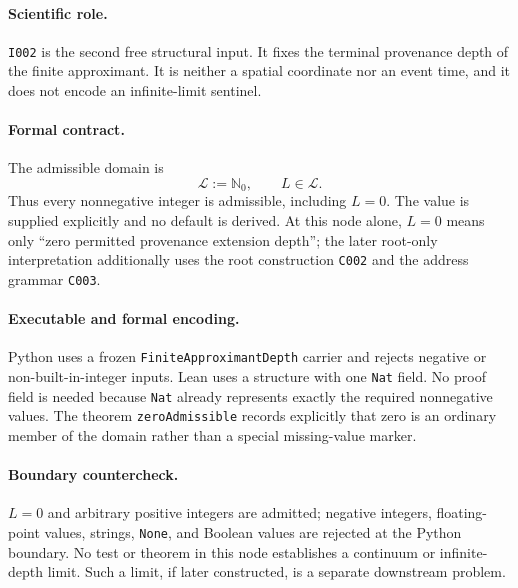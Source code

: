 
\paragraph*{Scientific role.}
\texttt{I002} is the second free structural input.  It fixes the terminal
provenance depth of the finite approximant.  It is neither a spatial
coordinate nor an event time, and it does not encode an infinite-limit
sentinel.

\paragraph*{Formal contract.}
The admissible domain is
\begin{equation}
  \mathcal L := \mathbb N_0,
  \qquad L\in\mathcal L.
  \label{eq:i002-depth-domain}
\end{equation}
Thus every nonnegative integer is admissible, including $L=0$.  The value is
supplied explicitly and no default is derived.  At this node alone, $L=0$
means only ``zero permitted provenance extension depth''; the later
root-only interpretation additionally uses the root construction
\texttt{C002} and the address grammar \texttt{C003}.

\paragraph*{Executable and formal encoding.}
Python uses a frozen \texttt{FiniteApproximantDepth} carrier and rejects
negative or non-built-in-integer inputs.  Lean uses a structure with one
\texttt{Nat} field.  No proof field is needed because \texttt{Nat} already
represents exactly the required nonnegative values.  The theorem
\texttt{zeroAdmissible} records explicitly that zero is an ordinary member of
the domain rather than a special missing-value marker.

\paragraph*{Boundary countercheck.}
$L=0$ and arbitrary positive integers are admitted; negative integers,
floating-point values, strings, \texttt{None}, and Boolean values are rejected
at the Python boundary.  No test or theorem in this node establishes a
continuum or infinite-depth limit.  Such a limit, if later constructed, is a
separate downstream problem.

